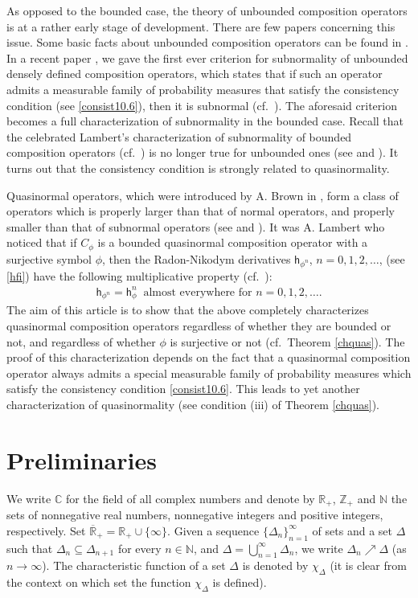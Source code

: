 \documentclass[draft,reqno]{amsproc}
\numberwithin{equation}{section}
\theoremstyle{remark}
\theoremstyle{definition}
\begin{document}
As opposed to the bounded case, the theory of
unbounded composition operators is at a rather early
stage of development. There are few papers concerning
this issue. Some basic facts about unbounded
composition operators can be found in
\cite{ca-hor,jab,b-j-j-sC}. In a recent paper
\cite{b-j-j-sD}, we gave the first ever criterion for
subnormality of unbounded densely defined composition
operators, which states that if such an operator
admits a measurable family of probability measures
that satisfy the consistency condition (see
\eqref{consist10.6}), then it is subnormal (cf.\
\cite[Theorem 3.5]{b-j-j-sD}). The aforesaid criterion
becomes a full characterization of subnormality in the
bounded case. Recall that the celebrated Lambert's
characterization of subnormality of bounded
composition operators (cf.\ \cite{lam1}) is no longer
true for unbounded ones (see \cite[Theorem
4.3.3]{j-j-s0} and \cite[Conclusion 10.5]{b-j-j-sC}).
It turns out that the consistency condition is
strongly related to quasinormality.

Quasinormal operators, which were introduced by A.
Brown in \cite{bro}, form a class of operators which
is properly larger than that of normal operators, and
properly smaller than that of subnormal operators (see
\cite[Theorem 1]{bro} and \cite[Theorem 2]{StSz2}). It
was A. Lambert who noticed that if $C_{\phi}$ is a
bounded quasinormal composition operator with a
surjective symbol $\phi$, then the Radon-Nikodym
derivatives ${\mathsf h}_{\phi^n}$, $n = 0, 1, 2, \ldots$,
(see \eqref{hfi}) have the following multiplicative
property (cf.\ \cite[p.\ 752]{lam1}):
   \begin{align*}
{\mathsf h}_{\phi^n} = {\mathsf h}_{\phi}^n \;\; \text{almost
everywhere for $n = 0, 1, 2, \ldots$.}
   \end{align*}
The aim of this article is to show that the above
completely characterizes quasinormal composition
operators regardless of whether they are bounded or
not, and regardless of whether $\phi$ is surjective or
not (cf.\ Theorem \ref{chquas}). The proof of this
characterization depends on the fact that a
quasinormal composition operator always admits a
special measurable family of probability measures
which satisfy the consistency condition
\eqref{consist10.6}. This leads to yet another
characterization of quasinormality (see condition
(iii) of Theorem \ref{chquas}).
   \section{Preliminaries}
We write ${\mathbb C}$ for the field of all complex numbers
and denote by ${\mathbb R}_+$, ${\mathbb Z}_+$ and ${\mathbb N}$ the sets
of nonnegative real numbers, nonnegative integers and
positive integers, respectively. Set ${{\overline{\mathbb R}_+}} = {\mathbb R}_+
\cup \{\infty\}$. Given a sequence
$\{\varDelta_n\}_{n=1}^\infty$ of sets and a set
$\varDelta$ such that $\varDelta_n \subseteq
\varDelta_{n+1}$ for every $n\in {\mathbb N}$, and $\varDelta
= \bigcup_{n=1}^\infty \varDelta_n$, we write
$\varDelta_n \nearrow \varDelta$ (as $n\to \infty$).
The characteristic function of a set $\varDelta$ is
denoted by $\chi_\varDelta$ (it is clear from the
context on which set the function $\chi_\varDelta$ is
defined).
\end{document}
